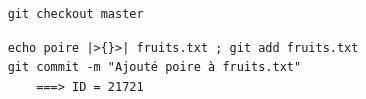 \documentclass[table,tikz,12pt,svgnames]{beamer}
\begin{document}
\begin{frame}[fragile]
{\begin{figure}
\begin{subfigure}[h]{\textwidth}
\begin{tikzpicture}
			\end{tikzpicture}
		\end{subfigure}
	\end{figure}
}

\vspace{0.4cm} \begin{center} \noindent{} \end{center} \vspace{-0.4cm}
\begin{verbatim}
	git checkout master
\end{verbatim}
\pause[3]
\begin{verbatim}
	echo poire |>{}>| fruits.txt ; git add fruits.txt
	git commit -m "Ajouté poire à fruits.txt"
		===> ID = 21721
\end{verbatim}
\end{frame}
\end{document}
